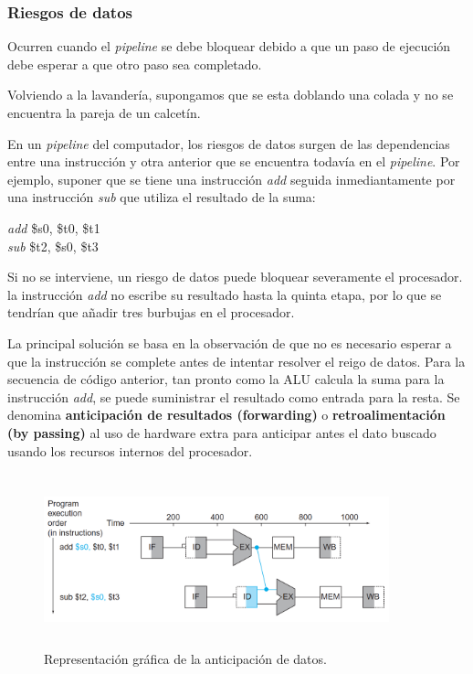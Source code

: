 \documentclass[12pt,a4paper]{report}
\begin{document}
			\subsubsection{Riesgos de datos}
				\par Ocurren cuando el \textit{pipeline} se debe bloquear debido a que un paso de ejecución debe esperar a que otro paso sea completado.
				\par Volviendo a la lavandería, supongamos que se esta doblando una colada y no se encuentra la pareja de un calcetín.
				\par En un \textit{pipeline} del computador, los riesgos de datos surgen de las dependencias entre una instrucción y otra anterior que se encuentra todavía en el \textit{pipeline}. Por ejemplo, suponer que se tiene una instrucción \textit{add} seguida inmediantamente por una instrucción \textit{sub} que utiliza el resultado de la suma:
				\begin{center}
					\textit{add} \qquad \$s0, \$t0, \$t1 \\
					\textit{sub} \qquad \$t2, \$s0, \$t3
				\end{center}

				\par Si no se interviene, un riesgo de datos puede bloquear severamente el procesador. la instrucción \textit{add} no escribe su resultado hasta la quinta etapa, por lo que se tendrían que añadir tres burbujas en el procesador.
				\par La principal solución se basa en la observación de que no es necesario esperar a que la instrucción se complete antes de intentar resolver el reigo de datos. Para la secuencia de código anterior, tan pronto como la ALU calcula la suma para la instrucción \textit{add}, se puede suministrar el resultado como entrada para la resta. Se denomina \textbf{anticipación de resultados (forwarding)} o \textbf{retroalimentación (by passing)} al uso de hardware extra para anticipar antes el dato buscado usando los recursos internos del procesador.

				\begin{figure}[htb]
					\centering
					\includegraphics[width=10cm, height=5cm]{./imagenes/datos.png}
					\caption{Representación gráfica de la anticipación de datos.}
				\end{figure}
\end{document}
